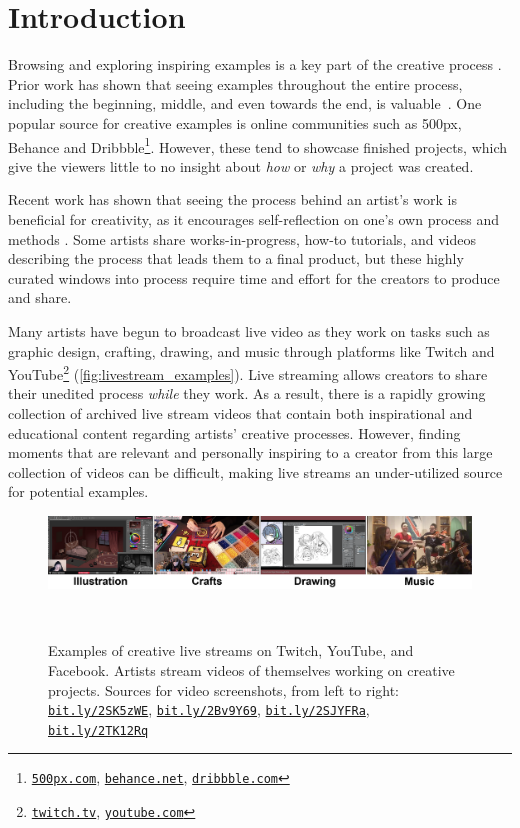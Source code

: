 \section{Introduction}
Browsing and exploring inspiring examples is a key part of the creative process \cite{Shneiderman2007, Shneiderman2002, Greene2002, Herring2009, Bawden1986}. Prior work has shown that seeing examples throughout the entire process, including the beginning, middle, and even towards the end, is valuable~\cite{Kulkarni2014, Siangliulue2015}. One popular source for creative examples is online communities such as 500px, Behance and Dribbble\footnote{\href{https://500px.com}{\nolinkurl{500px.com}}, \href{https://behance.net}{\nolinkurl{behance.net}}, \href{https://dribbble.com}{\nolinkurl{dribbble.com}}}. However, these tend to showcase finished projects, which give the viewers little to no insight about \textit{how} or \textit{why} a project was created. 

Recent work has shown that seeing the process behind an artist's work is beneficial for creativity, as it encourages self-reflection on one's own process and methods \cite{Kim2017}. Some artists share works-in-progress, how-to tutorials, and videos describing the process that leads them to a final product, but these highly curated windows into process require time and effort for the creators to produce and share. 

Many artists have begun to broadcast live video as they work on tasks such as graphic design, crafting, drawing, and music through platforms like Twitch and YouTube\footnote{\href{www.twitch.tv}{\nolinkurl{twitch.tv}}, \href{www.youtube.com}{\nolinkurl{youtube.com}}} (\autoref{fig:livestream_examples}). Live streaming allows creators to share their unedited process \emph{while} they work. As a result, there is a rapidly growing collection of archived live stream videos that contain both inspirational and educational content regarding artists' creative processes. However, finding moments that are relevant and personally inspiring to a creator from this large collection of videos can be difficult, making live streams an under-utilized source for potential examples.

\begin{figure}[b!]
\centering
  \includegraphics[width=\textwidth]{liveclips/figures/examples-horizontal.png}
  \caption{Examples of creative live streams on Twitch, YouTube, and Facebook. Artists stream videos of themselves working on creative projects. Sources for video screenshots, from left to right: \href{http://bit.ly/2SK5zWE}{\nolinkurl{bit.ly/2SK5zWE}}, \href{http://bit.ly/2Bv9Y69}{\nolinkurl{bit.ly/2Bv9Y69}}, \href{http://bit.ly/2SJYFRa}{\nolinkurl{bit.ly/2SJYFRa}}, \href{http://bit.ly/2TK12Rq}{\nolinkurl{bit.ly/2TK12Rq}}}~\label{fig:livestream_examples}
\end{figure}

